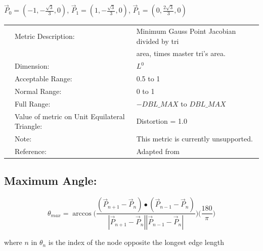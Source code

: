 \documentclass[12pt]{article}
\begin{document}
 $\vec P_0 = ( -1, -\frac {\sqrt{3}}{3}, 0 )$, 
 $\vec P_1 = ( 1, -\frac{\sqrt{3}}{3}, 0 )$,
 $\vec P_1 = ( 0, \frac{2\sqrt{3}}{3}, 0 )$ \newline

\begin{tabular}{lll}
& Metric Description:  & Minimum Gauss Point Jacobian divided by tri \\
&                      & area, times master tri's area. \\ 
& Dimension:           & $L^0$              \\ 
& Acceptable Range:    & 0.5 to 1            \\ 
& Normal Range:        & 0 to 1        \\ 
& Full Range:          & $-DBL\_MAX$ to $DBL\_MAX$        \\ 
& Value of metric on Unit Equilateral Triangle:       & Distortion = 1.0 \\
& Note:                & This metric is currently unsupported. \\ 
& Reference:           &  Adapted from \cite{six} \\
\end{tabular} 

\subsection*{Maximum Angle:}

\begin{displaymath}
\theta_{max}= \arccos{\Bigg( \frac {(\vec P_{n+1} - \vec P_n) \bullet (\vec P_{n-1} - \vec P_n)}
                 {|\vec P_{n+1} - \vec P_n | |\vec P_{n-1} - \vec P_n| } \Bigg) }
                 \Bigg( \frac {180} {\pi} \Bigg)
\end{displaymath}

\begin{flushleft}
where $n$ in $\theta_n$ is the index of the node opposite the longest edge length
\end{flushleft}
\end{document}
